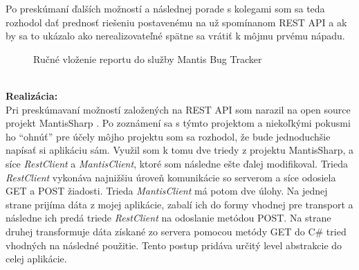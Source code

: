 \documentclass[slovak, bachelorpractice]{diploma}
\begin{document}
Po preskúmaní ďalších možností a následnej porade s kolegami som sa teda rozhodol dať prednosť riešeniu postavenému na už spomínanom REST API a ak by sa to ukázalo ako nerealizovateľné spätne sa vrátiť k môjmu prvému nápadu.
\vspace{-5pt}
\begin{figure}[!htbp]
	\centering
	\setlength{\fboxsep}{0pt}
	\setlength{\fboxrule}{1pt}
	\caption{Ručné vloženie reportu do služby Mantis Bug Tracker}
	\label{pic:Mantis}
\end{figure} \\
\textbf{Realizácia:} \\ Pri preskúmavaní možností založených na REST API som narazil na open source projekt MantisSharp \cite{MantisSharp}. Po zoznámení sa s týmto projektom a niekoľkými pokusmi ho \enquote{ohnúť} pre účely môjho projektu som sa rozhodol, že bude jednoduchšie napísať si aplikáciu sám. Využil som k tomu dve triedy z projektu MantisSharp, a síce \textit{RestClient} a \textit{MantisClient}, ktoré som následne ešte ďalej modifikoval. Trieda \textit{RestClient} vykonáva najnižšiu úroveň komunikácie so serverom a síce odosiela GET a POST žiadosti. Trieda \textit{MantisClient} má potom dve úlohy. Na jednej strane prijíma dáta z mojej aplikácie, zabalí ich do formy vhodnej pre transport a následne ich predá triede \textit{RestClient} na odoslanie metódou POST. Na strane druhej transformuje dáta získané zo servera pomocou metódy GET do C\# tried vhodných na následné použitie. Tento postup pridáva určitý level abstrakcie do celej aplikácie.
\end{document}

